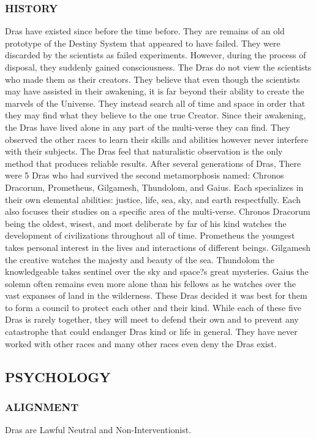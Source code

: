 \subsubsection{HISTORY}
Dras have existed since before the time before.  They are remains of an old
prototype of the Destiny System that appeared to have failed.  They were
discarded by the scientists as failed experiments.  However, during the process
of disposal, they suddenly gained consciousness.  The Dras do not view the
scientists who made them as their creators.  They believe that even though the
scientists may have assisted in their awakening, it is far beyond their ability
to create the marvels of the Universe.  They instead search all of time and
space in order that they may find what they believe to the one true Creator.
Since their awakening, the Dras have lived alone in any part of the multi-verse
they can find.  They observed the other races to learn their skills and
abilities however never interfere with their subjects.  The Dras feel that
naturalistic observation is the only method that produces reliable results.
After several generations of Dras, There were 5 Dras who had survived the
second metamorphosis named: Chronos Dracorum, Prometheus, Gilgamesh, Thundolom,
and Gaius.  Each specializes in their own elemental abilities: justice, life,
sea, sky, and earth respectfully.  Each also focuses their studies on a
specific area of the multi-verse.  Chronos Dracorum being the oldest, wisest,
and most deliberate by far of his kind watches the development of civilizations
throughout all of time.  Prometheus the youngest takes personal interest in the
lives and interactions of different beings.  Gilgamesh the creative watches the
majesty and beauty of the sea.  Thundolom the knowledgeable takes sentinel over
the sky and space?s great mysteries.  Gaius the solemn often remains even more
alone than his fellows as he watches over the vast expanses of land in the
wilderness.  These Dras decided it was best for them to form a council to
protect each other and their kind.  While each of these five Dras is rarely
together, they will meet to defend their own and to prevent any catastrophe
that could endanger Dras kind or life in general.  They have never worked with
other races and many other races even deny the Dras exist.
\subsection{PSYCHOLOGY}
\subsubsection{ALIGNMENT}
Dras are Lawful Neutral and Non-Interventionist.

